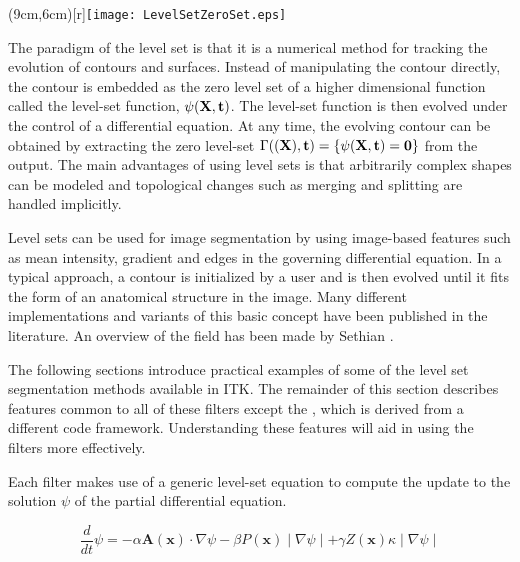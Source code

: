 %
%
% 
%
%
%



\parpic(9cm,6cm)[r]{\texttt{[image: LevelSetZeroSet.eps]}}

The paradigm of the level set is that it is a numerical method for tracking
the evolution of contours and surfaces. Instead of manipulating the contour
directly, the contour is embedded as the zero level set of a higher
dimensional function called the level-set function, $\psi(\bf{X},t)$. The
level-set function is then evolved under the control of a differential
equation.  At any time, the evolving contour can be obtained by extracting
the zero level-set $\Gamma(\bf(X),t) =
\{\psi(\bf{X},t) = 0\}$ from the output.  The main advantages of using level
sets is that arbitrarily complex shapes can be modeled and topological
changes such as merging and splitting are handled implicitly. 

Level sets can be used for image segmentation by using image-based features
such as mean intensity, gradient and edges in the governing differential
equation.  In a typical approach, a contour is initialized by a user and is
then evolved until it fits the form of an anatomical structure in the image.
Many different implementations and variants of this basic concept have been
published in the literature. An overview of the field has been made by
Sethian \cite{Sethian1996}.

The following sections introduce practical examples of some
of the level set segmentation methods available in ITK.  The remainder of this
section describes features common to all of these filters except the
, which is derived from a different code
framework.  Understanding these features will aid in using the filters
more effectively.

Each filter makes use of a generic level-set equation to compute the update to
the solution $\psi$ of the partial differential equation.

\begin{equation}
\label{eqn:LevelSetEquation}
\frac{d}{dt}\psi = -\alpha \mathbf{A}(\mathbf{x})\cdot\nabla\psi - \beta
  P(\mathbf{x})\mid\nabla\psi\mid + 
\gamma Z(\mathbf{x})\kappa\mid\nabla\psi\mid
\end{equation}
 

